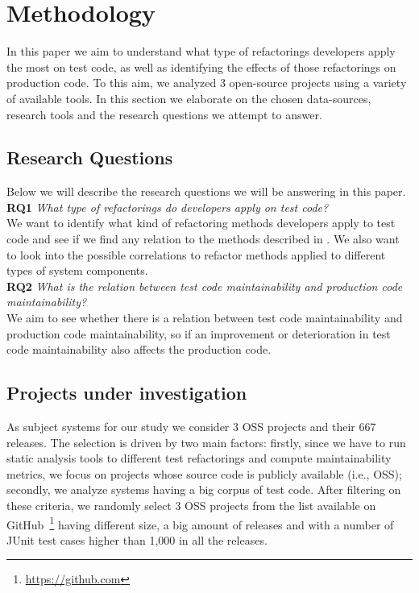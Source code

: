 
\section{Methodology}
In this paper we aim to understand what type of refactorings developers apply the most on test code, as well as identifying the effects of those refactorings on production code. To this aim, we analyzed 3 open-source projects using a variety of available tools. In this section we elaborate on the chosen data-sources, research tools and the research questions we attempt to answer.

\subsection{Research Questions}
\label{rqs}
Below we will describe the research questions we will be answering in this paper.\\
\indent\textbf{RQ1} \textit{What type of refactorings do developers apply on test code?}\\
We want to identify what kind of refactoring methods developers apply to test code and see if we find any relation to the methods described in \cite{van2001refactoring}. We also want to look into the possible correlations to refactor methods applied to different types of system components.\\
\indent\textbf{RQ2} \textit{What is the relation between test code maintainability and production code maintainability?}\\
We aim to see whether there is a relation between test code maintainability and production code maintainability, so if an improvement or deterioration in test code maintainability also affects the production code. 

\subsection{Projects under investigation}
As subject systems for our study we consider 3 OSS projects and their 667 releases. The selection is driven by two main factors: firstly, since we have to run static analysis tools to different test refactorings and compute maintainability metrics, we focus on projects whose source code is publicly available (i.e., OSS); secondly, we analyze systems having a big corpus of test code. After filtering on these criteria, we randomly select 3 OSS projects from the list available on GitHub~\footnote{\url{https://github.com}} having different size, a big amount of releases and with a number of JUnit test cases higher than 1,000 in all the releases.

